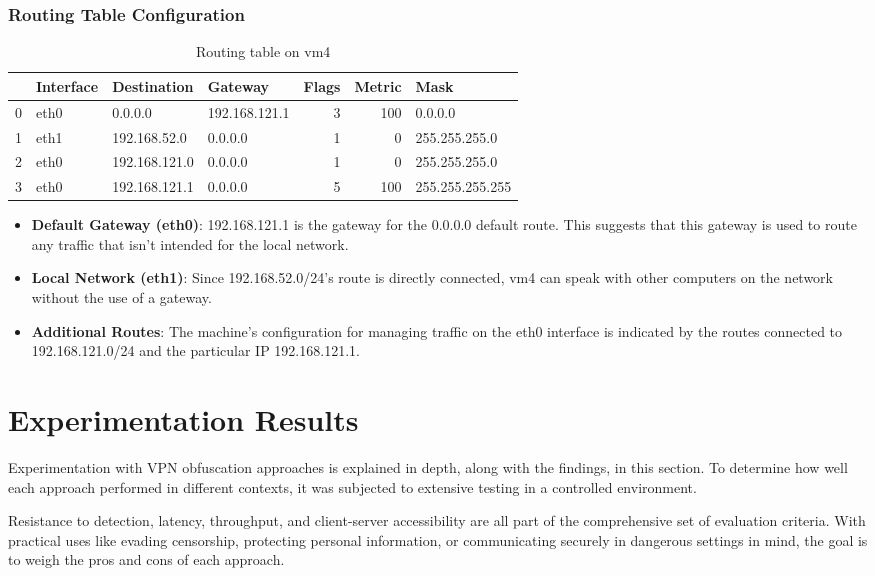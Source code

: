 \documentclass[12pt, fleqn, a4paper]{article}
\begin{document}
\subsubsection{Routing Table Configuration}
\begin{table}[H]
	\caption{Routing table on vm4}
	\centering
  \begin{tabular}{llllrrl}
\toprule
{} & Interface &    Destination &        Gateway &  Flags &  Metric &             Mask \\
\midrule
0 &      eth0 &        0.0.0.0 &  192.168.121.1 &      3 &     100 &          0.0.0.0 \\
1 &      eth1 &   192.168.52.0 &        0.0.0.0 &      1 &       0 &    255.255.255.0 \\
2 &      eth0 &  192.168.121.0 &        0.0.0.0 &      1 &       0 &    255.255.255.0 \\
3 &      eth0 &  192.168.121.1 &        0.0.0.0 &      5 &     100 &  255.255.255.255 \\
\bottomrule
\end{tabular}
  \label{tab:vm4_2}
\end{table}
\begin{itemize}
\item \textbf{Default Gateway (eth0)}: 192.168.121.1 is the gateway for the 0.0.0.0 default route. This suggests that this gateway is used to route any traffic that isn't intended for the local network.
\item \textbf{Local Network (eth1)}: Since 192.168.52.0/24's route is directly connected, vm4 can speak with other computers on the network without the use of a gateway.
\item \textbf{Additional Routes}: The machine's configuration for managing traffic on the eth0 interface is indicated by the routes connected to 192.168.121.0/24 and the particular IP 192.168.121.1.
\end{itemize}

\section{Experimentation Results}
Experimentation with VPN obfuscation approaches is explained in depth, along with the findings, in this section. To determine how well each approach performed in different contexts, it was subjected to extensive testing in a controlled environment.

Resistance to detection, latency, throughput, and client-server accessibility are all part of the comprehensive set of evaluation criteria. With practical uses like evading censorship, protecting personal information, or communicating securely in dangerous settings in mind, the goal is to weigh the pros and cons of each approach.
\end{document}
